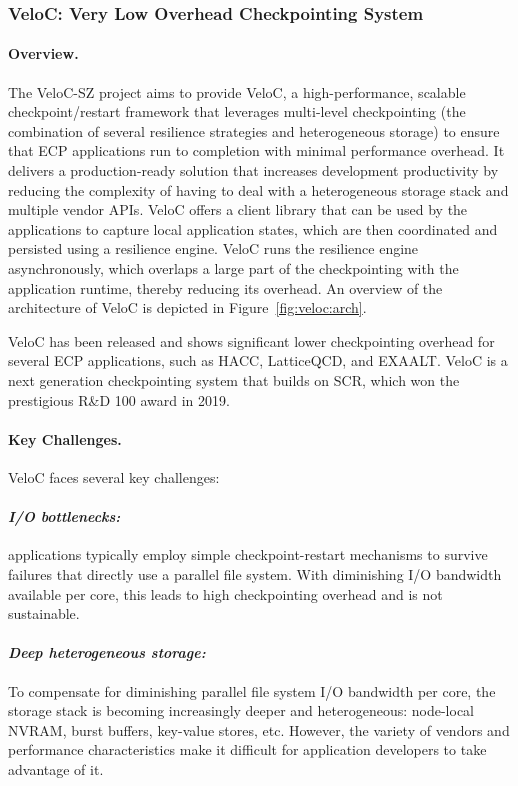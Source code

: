 \subsubsection{ VeloC: Very Low Overhead Checkpointing System}

\paragraph{Overview.}
The VeloC-SZ project aims to provide VeloC, a high-performance,
scalable checkpoint/restart framework that leverages multi-level
checkpointing (the combination of several resilience strategies and
heterogeneous storage) to ensure that ECP applications run to
completion with minimal performance overhead. It delivers a
production-ready solution that increases development productivity by
reducing the complexity of having to deal with a heterogeneous storage
stack and multiple vendor APIs. VeloC offers a client library that can
be used by the applications to capture local application states, which
are then coordinated and persisted using a resilience engine.  VeloC
runs the resilience engine asynchronously, which overlaps a large part
of the checkpointing with the application runtime, thereby reducing
its overhead. An overview of the architecture of VeloC is depicted
in Figure~\ref{fig:veloc:arch}.

VeloC has been released and shows significant lower checkpointing
overhead for several ECP applications, such as HACC, LatticeQCD,
and EXAALT. VeloC is a next generation checkpointing system that builds on
SCR, which won the prestigious R\&D 100 award in 2019.

\paragraph{Key Challenges.}
VeloC faces several key challenges:
\vspace{-1em}

\paragraph{\emph{I/O bottlenecks:}} applications typically employ
simple checkpoint-restart mechanisms to survive failures that directly
use a parallel file system. With diminishing I/O bandwidth available
per core, this leads to high checkpointing overhead and is not
sustainable.
\vspace{-1em}

\paragraph{\emph{Deep heterogeneous storage:}} To compensate for
diminishing parallel file system I/O bandwidth per core, the storage
stack is becoming increasingly deeper and heterogeneous: node-local
NVRAM, burst buffers, key-value stores, etc. However, the variety of
vendors and performance characteristics make it difficult for
application developers to take advantage of it.
\vspace{-1em}

